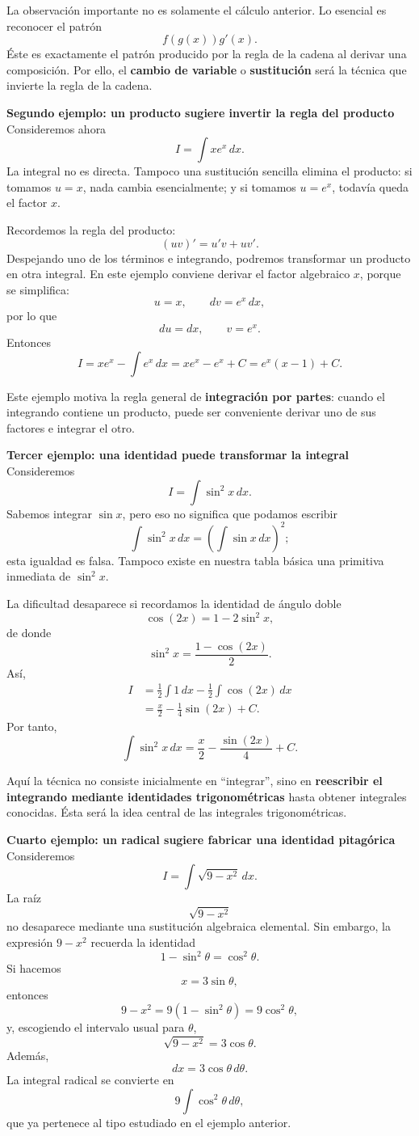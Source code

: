 \documentclass[12pt]{article}
\theoremstyle{definition}
\theoremstyle{remark}
\begin{document}
La observación importante no es solamente el cálculo anterior. Lo esencial es reconocer el patrón
\[
\boxed{f(g(x))g'(x)}.
\]
Éste es exactamente el patrón producido por la regla de la cadena al derivar una composición. Por ello, el \textbf{cambio de variable} o \textbf{sustitución} será la técnica que invierte la regla de la cadena.

\textbf{Segundo ejemplo: un producto sugiere invertir la regla del producto}
Consideremos ahora
\[
I=\int xe^x\,dx.
\]
La integral no es directa. Tampoco una sustitución sencilla elimina el producto: si tomamos $u=x$, nada cambia esencialmente; y si tomamos $u=e^x$, todavía queda el factor $x$.

Recordemos la regla del producto:
\[
(uv)'=u'v+uv'.
\]
Despejando uno de los términos e integrando, podremos transformar un producto en otra integral. En este ejemplo conviene derivar el factor algebraico $x$, porque se simplifica:
\[
u=x,\qquad dv=e^x\,dx,
\]
por lo que
\[
du=dx,\qquad v=e^x.
\]
Entonces
\[
I=xe^x-\int e^x\,dx
=xe^x-e^x+C
=\boxed{e^x(x-1)+C}.
\]

Este ejemplo motiva la regla general de \textbf{integración por partes}: cuando el integrando contiene un producto, puede ser conveniente derivar uno de sus factores e integrar el otro.

\textbf{Tercer ejemplo: una identidad puede transformar la integral}
Consideremos
\[
I=\int\sin^2x\,dx.
\]
Sabemos integrar $\sin x$, pero eso no significa que podamos escribir
\[
\int\sin^2x\,dx=(\int\sin x\,dx)^2;
\]
esta igualdad es falsa. Tampoco existe en nuestra tabla básica una primitiva inmediata de $\sin^2x$.

La dificultad desaparece si recordamos la identidad de ángulo doble
\[
\cos(2x)=1-2\sin^2x,
\]
de donde
\[
\sin^2x=\frac{1-\cos(2x)}{2}.
\]
Así,
\begin{align*}
I&=\frac12\int1\,dx-\frac12\int\cos(2x)\,dx\\
&=\frac{x}{2}-\frac14\sin(2x)+C.
\end{align*}
Por tanto,
\[
\boxed{\int\sin^2x\,dx=\frac{x}{2}-\frac{\sin(2x)}{4}+C}.
\]

Aquí la técnica no consiste inicialmente en ``integrar'', sino en \textbf{reescribir el integrando mediante identidades trigonométricas} hasta obtener integrales conocidas. Ésta será la idea central de las integrales trigonométricas.

\textbf{Cuarto ejemplo: un radical sugiere fabricar una identidad pitagórica}
Consideremos
\[
I=\int\sqrt{9-x^2}\,dx.
\]
La raíz
\[
\sqrt{9-x^2}
\]
no desaparece mediante una sustitución algebraica elemental. Sin embargo, la expresión $9-x^2$ recuerda la identidad
\[
1-\sin^2\theta=\cos^2\theta.
\]
Si hacemos
\[
x=3\sin\theta,
\]
entonces
\[
9-x^2=9(1-\sin^2\theta)=9\cos^2\theta,
\]
y, escogiendo el intervalo usual para $\theta$,
\[
\sqrt{9-x^2}=3\cos\theta.
\]
Además,
\[
dx=3\cos\theta\,d\theta.
\]
La integral radical se convierte en
\[
9\int\cos^2\theta\,d\theta,
\]
que ya pertenece al tipo estudiado en el ejemplo anterior.
\end{document}

